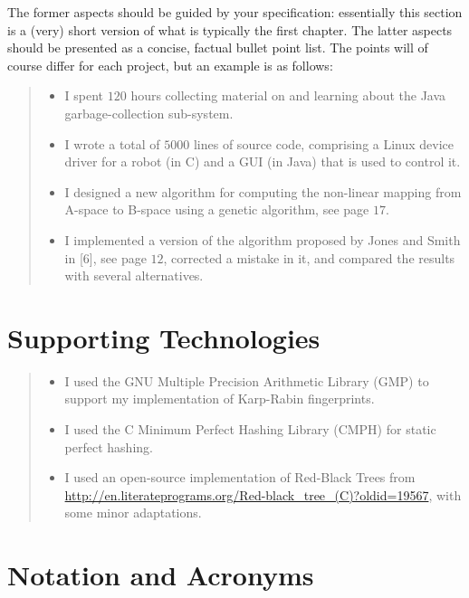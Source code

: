 \documentclass[ %
                    author={Dominic Joseph Moylett},
                supervisor={Dr. Raphael Clifford and Dr. Benjamin Sach},
                    degree={MEng},
                     title={Dictionary Matching with Fingerprints},
                  subtitle={An Empirical Analysis},
                      type={Research},
                      year={2014} ]{dissertation}
\begin{document}
The former aspects should be guided by your specification: essentially 
this section is a (very) short version of what is typically the first 
chapter.  The latter aspects should be presented as a concise, factual 
bullet point list.  The points will of course differ for each project, 
but an example is as follows:

\begin{quote}
\noindent
\begin{itemize}
\item I spent $120$ hours collecting material on and learning about the 
      Java garbage-collection sub-system. 
\item I wrote a total of $5000$ lines of source code, comprising a Linux 
      device driver for a robot (in C) and a GUI (in Java) that is 
      used to control it.
\item I designed a new algorithm for computing the non-linear mapping 
      from A-space to B-space using a genetic algorithm, see page $17$.
\item I implemented a version of the algorithm proposed by Jones and 
      Smith in [6], see page $12$, corrected a mistake in it, and 
      compared the results with several alternatives.
\end{itemize}
\end{quote}

\chapter*{Supporting Technologies}

\begin{quote}
\noindent
\begin{itemize}
\item I used the GNU Multiple Precision Arithmetic Library (GMP) to support my implementation of Karp-Rabin fingerprints.
\item I used the C Minimum Perfect Hashing Library (CMPH) for static perfect hashing.
\item I used an open-source implementation of Red-Black Trees from \url{http://en.literateprograms.org/Red-black_tree_(C)?oldid=19567}, with some minor adaptations.
\end{itemize}
\end{quote}


\chapter*{Notation and Acronyms}
\end{document}

